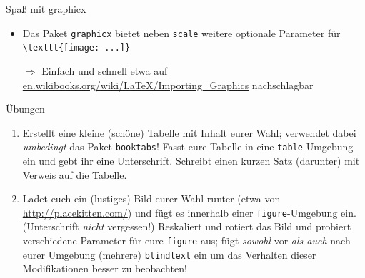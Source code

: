 \documentclass[11pt]{beamer}
\begin{document}
\begin{frame}[fragile]{Spaß mit graphicx}
\begin{itemize}
\item Das Paket \texttt{graphicx} bietet neben \texttt{scale} weitere optionale Parameter für \verb~\texttt{[image: ...]}~
\item[$\Rightarrow$] Einfach und schnell etwa auf\\
 \url{en.wikibooks.org/wiki/LaTeX/Importing_Graphics} nachschlagbar \smiley
\end{itemize}
\end{frame}

\begin{frame}{Übungen}
\begin{enumerate}
\item Erstellt eine kleine (schöne) Tabelle mit Inhalt eurer Wahl; verwendet dabei \emph{umbedingt} das Paket \texttt{booktabs}! Fasst eure Tabelle in eine \texttt{table}-Umgebung ein und gebt ihr eine Unterschrift. Schreibt einen kurzen Satz (darunter) mit Verweis auf die Tabelle.
\item Ladet euch ein (lustiges) Bild eurer Wahl runter (etwa von \url{http://placekitten.com/}) und fügt es innerhalb einer \texttt{figure}-Umgebung ein. (Unterschrift \emph{nicht} vergessen!) Reskaliert und rotiert das Bild und probiert verschiedene Parameter für eure \texttt{figure} aus; fügt \emph{sowohl} vor \emph{als auch} nach eurer Umgebung (mehrere) \texttt{blindtext} ein um das Verhalten dieser Modifikationen besser zu beobachten!
\end{enumerate}
\end{frame}
\end{document}
